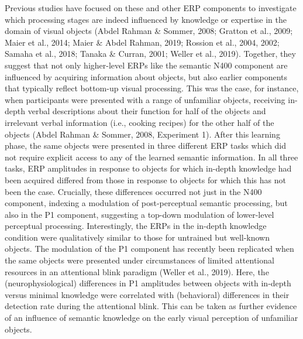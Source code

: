 \documentclass[
  english,
  doc,12pt,twoside,floatsintext]{apa7}
\begin{document}
Previous studies have focused on these and other ERP components to investigate which processing stages are indeed influenced by knowledge or expertise in the domain of visual objects (Abdel Rahman \& Sommer, 2008; Gratton et al., 2009; Maier et al., 2014; Maier \& Abdel Rahman, 2019; Rossion et al., 2004, 2002; Samaha et al., 2018; Tanaka \& Curran, 2001; Weller et al., 2019). Together, they suggest that not only higher-level ERPs like the semantic N400 component are influenced by acquiring information about objects, but also earlier components that typically reflect bottom-up visual processing. This was the case, for instance, when participants were presented with a range of unfamiliar objects, receiving in-depth verbal descriptions about their function for half of the objects and irrelevant verbal information (i.e., cooking recipes) for the other half of the objects (Abdel Rahman \& Sommer, 2008, Experiment 1). After this learning phase, the same objects were presented in three different ERP tasks which did not require explicit access to any of the learned semantic information. In all three tasks, ERP amplitudes in response to objects for which in-depth knowledge had been acquired differed from those in response to objects for which this has not been the case. Crucially, these differences occurred not just in the N400 component, indexing a modulation of post-perceptual semantic processing, but also in the P1 component, suggesting a top-down modulation of lower-level perceptual processing. Interestingly, the ERPs in the in-depth knowledge condition were qualitatively similar to those for untrained but well-known objects. The modulation of the P1 component has recently been replicated when the same objects were presented under circumstances of limited attentional resources in an attentional blink paradigm (Weller et al., 2019). Here, the (neurophysiological) differences in P1 amplitudes between objects with in-depth versus minimal knowledge were correlated with (behavioral) differences in their detection rate during the attentional blink. This can be taken as further evidence of an influence of semantic knowledge on the early visual perception of unfamiliar objects.
\end{document}
